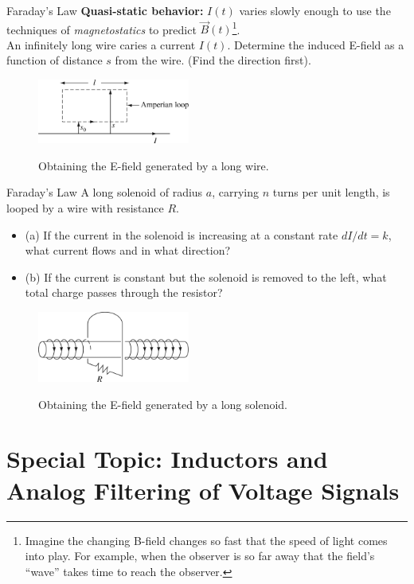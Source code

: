 \documentclass{beamer}
\begin{document}
\begin{frame}{Faraday's Law}
\textbf{Quasi-static behavior:}  $I(t)$ varies slowly enough to use the techniques of \textit{magnetostatics} to predict $\vec{B}(t)$\footnote{Imagine the changing B-field changes so fast that the speed of light comes into play.  For example, when the observer is so far away that the field's ``wave'' takes time to reach the observer.}. \\ \vspace{0.25cm}
An infinitely long wire caries a current $I(t)$. Determine the induced E-field as a function of distance $s$ from the wire. (Find the direction first).
\begin{figure}
\centering
\includegraphics[width=5cm]{figures/7_27.jpg} \\
\caption{\label{fig:far2} Obtaining the E-field generated by a long wire.}
\end{figure}
\end{frame}

\begin{frame}{Faraday's Law}
A long solenoid of radius $a$, carrying $n$ turns per unit length, is looped by a wire with resistance $R$.
\begin{itemize}
\item (a) If the current in the solenoid is increasing at a constant rate $dI/dt = k$, what current flows and in what direction?
\item (b) If the current is constant but the solenoid is removed to the left, what total charge passes through the resistor?
\end{itemize}
\begin{figure}
\centering
\includegraphics[width=5cm]{figures/7_28.jpg} \\
\caption{\label{fig:far3} Obtaining the E-field generated by a long solenoid.}
\end{figure}
\end{frame}

\section{Special Topic: Inductors and Analog Filtering of Voltage Signals}
\end{document}
